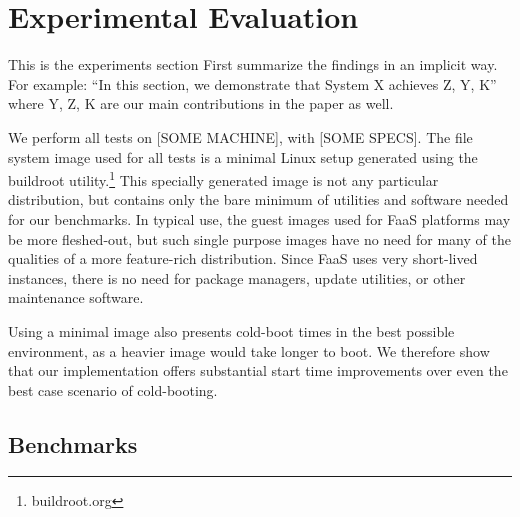 \section{Experimental Evaluation} \label{sec:experiments}
This is the experiments section
First summarize the findings in an implicit way. For example:
``In this section, we demonstrate that System X achieves Z, Y, K''
where Y, Z, K are our main contributions in the paper as well.

%

We perform all tests on [SOME MACHINE], with [SOME SPECS]. The file system image used for all tests is a minimal Linux setup generated using the buildroot utility.\footnote{buildroot.org} This specially generated image is not any particular distribution, but contains only the bare minimum of utilities and software needed for our benchmarks. In typical use, the guest images used for FaaS platforms may be more fleshed-out, but such single purpose images have no need for many of the qualities of a more feature-rich distribution. Since FaaS uses very short-lived instances, there is no need for package managers, update utilities, or other maintenance software.

Using a minimal image also presents cold-boot times in the best possible environment, as a heavier image would take longer to boot. We therefore show that our implementation offers substantial start time improvements over even the best case scenario of cold-booting.

\subsection{Benchmarks}

